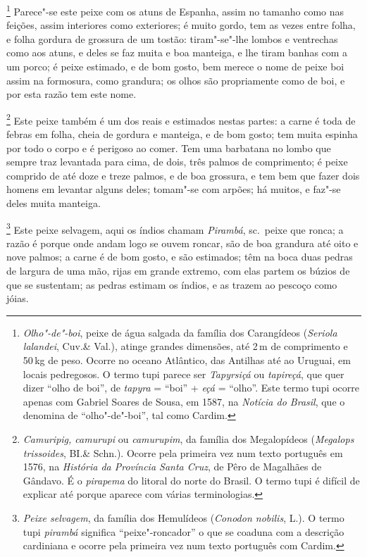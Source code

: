 \begin{linenumbers}
\footnote{ \textit{Olho"-de"-boi}, peixe de água
salgada da família dos Carangídeos (\textit{Seriola lalandei}, Cuv.\&
Val.), atinge grandes dimensões, até 2\,m de comprimento e 50\,kg de peso.
Ocorre no oceano Atlântico, das Antilhas até ao Uruguai, em locais
pedregosos. O termo tupi parece ser \textit{Tapyrsiçá} ou
\textit{tapireçá}, que quer dizer ``olho de boi'', de \textit{tapyra} = 
``boi'' + \textit{eçá} = ``olho''. Este termo tupi ocorre apenas com
Gabriel Soares de Sousa, em 1587, na \textit{Notícia do Brasil}, que o
denomina de ``olho"-de"-boi'', tal como Cardim.} 
Parece"-se este peixe com os atuns de Espanha, assim no tamanho como
nas feições, assim interiores como exteriores; é muito gordo, tem as
vezes entre folha, e folha gordura de grossura de um tostão:
tiram"-se"-lhe lombos e ventrechas como aos atuns, e deles se faz muita e
boa manteiga, e lhe tiram banhas com a um porco; é peixe estimado, e de
bom gosto, bem merece o nome de peixe boi assim na formosura, como
grandura; os olhos são propriamente como de boi, e por esta razão tem este nome.

\footnote{ \textit{Camuripig, camurupi} ou
\textit{camurupim}, da família dos Megalopídeos (\textit{Megalops
trissoides}, BI.\& Schn.). Ocorre pela primeira vez num texto português
em 1576, na \textit{História da Província Santa Cruz}, de Pêro de
Magalhães de Gândavo. É o \textit{pirapema} do litoral do norte do Brasil.
O termo tupi é difícil de explicar até porque aparece com várias
terminologias.} Este peixe também é um dos reais e
estimados nestas partes: a carne é toda de febras em folha, cheia de
gordura e manteiga, e de bom gosto; tem muita espinha por todo o corpo
e é perigoso ao comer. Tem uma barbatana no lombo que sempre traz
levantada para cima, de dois, três palmos de comprimento; é peixe
comprido de até doze e treze palmos, e de boa grossura, e tem bem que
fazer dois homens em levantar alguns deles; tomam"-se com arpões; há
muitos, e faz"-se deles muita manteiga.

\footnote{ \textit{Peixe selvagem}, da família
dos Hemulídeos (\textit{Conodon nobilis}, L.). O termo tupi
\textit{pirambá} significa ``peixe"-roncador'' o que se coaduna com a
descrição cardiniana e ocorre pela primeira vez num texto português com
Cardim.} Este peixe selvagem, aqui os índios chamam
\textit{Pirambá}, sc.~peixe que ronca; a razão é porque onde andam
logo se ouvem roncar, são de boa grandura até oito e nove palmos; a 
carne é de bom gosto, e são estimados; têm na boca duas pedras de
largura de uma mão, rijas em grande extremo, com elas partem os búzios
de que se sustentam; as pedras estimam os índios, e as trazem ao
pescoço como jóias.


\end{linenumbers}
